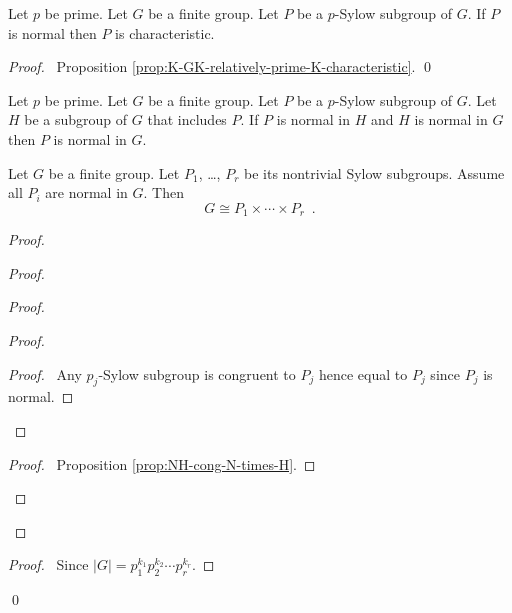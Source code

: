 \begin{prop}
Let $p$ be prime. Let $G$ be a finite group. Let $P$ be a $p$-Sylow subgroup of $G$. If $P$ is normal then $P$ is characteristic.
\end{prop}

\begin{proof}
\pf\ Proposition \ref{prop:K-GK-relatively-prime-K-characteristic}. \qed
\end{proof}

\begin{cor}
\label{cor:normal-normal-normal}
Let $p$ be prime. Let $G$ be a finite group. Let $P$ be a $p$-Sylow subgroup of $G$. Let $H$ be a subgroup of $G$ that includes $P$. If $P$ is normal in $H$ and $H$ is normal in $G$ then $P$ is normal in $G$.
\end{cor}

\begin{prop}
\label{prop:P1-times-cdots-times-Pr}
Let $G$ be a finite group. Let $P_1$, \ldots, $P_r$ be its nontrivial Sylow subgroups. Assume all $P_i$ are normal in $G$. Then
\[ G \cong P_1 \times \cdots \times P_r \enspace . \]
\end{prop}

\begin{proof}
\pf
{}
\begin{proof}
	\begin{proof}
		\begin{proof}
			\begin{proof}
				\pf\ Any $p_j$-Sylow subgroup is congruent to $P_j$ hence equal to $P_j$ since $P_j$ is normal.
			\end{proof}
		\end{proof}
		\begin{proof}
			\pf\ Proposition \ref{prop:NH-cong-N-times-H}.
		\end{proof}
	\end{proof}
\end{proof}
\begin{proof}
	\pf\ Since $|G| = p_1^{k_1} p_2^{k_2} \cdots p_r^{k_r}$.
\end{proof}
\qed
\end{proof}

